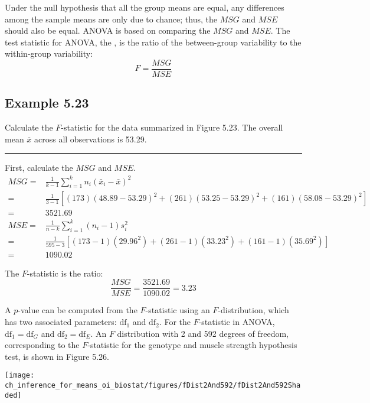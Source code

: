 \documentclass[
  letterpaper,
  DIV=11,
  numbers=noendperiod]{scrreprt}
\begin{document}
Under the null hypothesis that all the group means are equal, any
differences among the sample means are only due to chance; thus, the
\(MSG\) and \(MSE\) should also be equal. ANOVA is based on comparing
the \(MSG\) and \(MSE\). The test statistic for ANOVA, the
, is the ratio of the between-group variability to the
within-group variability: \[
F = \frac{MSG}{MSE}
\]

\hypertarget{example-5.23}{%
\subsection{Example 5.23}\label{example-5.23}}

Calculate the \(F\)-statistic for the  data summarized in
Figure 5.23. The overall mean \(\overline{x}\) across all observations
is 53.29.

\begin{center}\rule{0.5\linewidth}{0.5pt}\end{center}

First, calculate the \(MSG\) and \(MSE\). \vspace{0mm} \begin{align*}
MSG =& \frac{1}{k-1}\sum_{i=1}^{k} n_{i}\left(\bar{x}_{i} - \bar{x}\right)^{2} \\
=& \frac{1}{3-1} [(173)(48.89 - 53.29)^{2} + (261)(53.25 - 53.29)^{2} + (161)(58.08 - 53.29)^{2} ]\\
=& 3521.69 \\
MSE =& \frac{1}{n-k}\sum_{i=1}^{k} (n_i-1)s_i^{2} \\
=& \frac{1}{595-3}[(173-1)(29.96^2) + (261-1)(33.23^2) + (161-1)(35.69^2)] \\
=& 1090.02
\end{align*}

The \(F\)-statistic is the ratio: \[
\dfrac{MSG}{MSE} = \dfrac{3521.69}{1090.02} = 3.23
\]

A \(p\)-value can be computed from the \(F\)-statistic using an
\(F\)-distribution, which has two associated parameters:
\(\textrm{df}_{1}\) and \(\textrm{df}_{2}\). For the \(F\)-statistic in
ANOVA, \(\textrm{df}_{1} = \textrm{df}_{G}\) and
\(\textrm{df}_{2}= \textrm{df}_{E}\). An \(F\) distribution with 2 and
592 degrees of freedom, corresponding to the \(F\)-statistic for the
genotype and muscle strength hypothesis test, is shown in Figure 5.26.

\texttt{[image: ch\_inference\_for\_means\_oi\_biostat/figures/fDist2And592/fDist2And592Shaded]}
\end{document}
